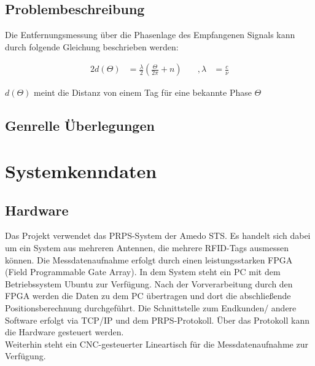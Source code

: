 \documentclass[a4paper,12pt,fleqn]{article}
\begin{document}
\subsection{Problembeschreibung}

Die Entfernungsmessung über die Phasenlage des Empfangenen Signals kann durch folgende Gleichung beschrieben werden:

\begin{alignat}{2}\label{eq:Wavenumbers}
 	d(\Theta)&=\frac{\lambda}{2}(\frac{\Theta}{2\pi}+n) &\quad
 	,\lambda&=\frac{c}{\nu}
\end{alignat}

$d(\Theta)$ meint die Distanz von einem Tag für eine bekannte Phase $\Theta$
\subsection{Genrelle Überlegungen}

\section{Systemkenndaten}

\subsection{Hardware}
Das Projekt verwendet das PRPS-System der Amedo STS. Es handelt sich dabei um ein System aus mehreren Antennen, die mehrere RFID-Tags ausmessen können. Die Messdatenaufnahme erfolgt durch einen leistungsstarken FPGA (Field Programmable Gate Array). In dem System steht ein PC mit dem Betriebssystem Ubuntu zur Verfügung. Nach der Vorverarbeitung durch den FPGA werden die Daten zu dem PC übertragen und dort die abschließende Positionsberechnung durchgeführt. Die Schnittstelle zum Endkunden/ andere Software erfolgt via TCP/IP und dem PRPS-Protokoll. Über das Protokoll kann die Hardware gesteuert werden.\\
Weiterhin steht ein CNC-gesteuerter Lineartisch für die Messdatenaufnahme zur Verfügung.
\end{document}
